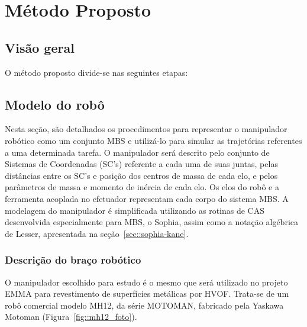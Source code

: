 \chapter{Método Proposto}



\section{Visão geral}

O método proposto divide-se nas seguintes etapas:



\section{Modelo do robô}

Nesta seção, são detalhados os procedimentos para representar o manipulador
robótico como um conjunto MBS e utilizá-lo para simular as trajetórias
referentes a uma determinada tarefa. O manipulador será descrito pelo conjunto
de Sistemas de Coordenadas (SC's) referente a cada uma de suas juntas, pelas
distâncias entre os SC's e posição dos centros de massa de cada elo, e pelos
parâmetros de massa e momento de inércia de cada elo. Os elos do robô e a
ferramenta acoplada no efetuador representam cada corpo do sistema MBS. A
modelagem do manipulador é simplificada utilizando as rotinas de CAS
desenvolvida especialmente para MBS, o Sophia, assim como a notação algébrica de
Lesser, apresentada na seção~\ref{sec::sophia-kane}.

\subsection{Descrição do braço robótico} \label{sec::descricao_mh12}

O manipulador escolhido para estudo é o mesmo que será utilizado no projeto EMMA
para revestimento de superfícies metálicas por HVOF. Trata-se de um robô
comercial modelo MH12, da série MOTOMAN, fabricado pela Yaskawa Motoman
(Figura~\ref{fig::mh12_foto}).

